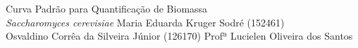 \documentclass[12pt]{article}
\begin{document}
\capa
    {Curva Padrão para Quantificação de Biomassa\\[0.3cm]\textit{Saccharomyces cerevisiae}}
    {Maria Eduarda Kruger Sodré (152461) \\ Osvaldino Corrêa da Silveira Júnior (126170)}
    {Profª Lucielen Oliveira dos Santos}

\pagestyle{empty}
{
  \renewcommand{\contentsname}{\hfill\bfseries Sumário\hfill}
  \tableofcontents
}
\newpage
\pagestyle{fancy}








\end{document}
